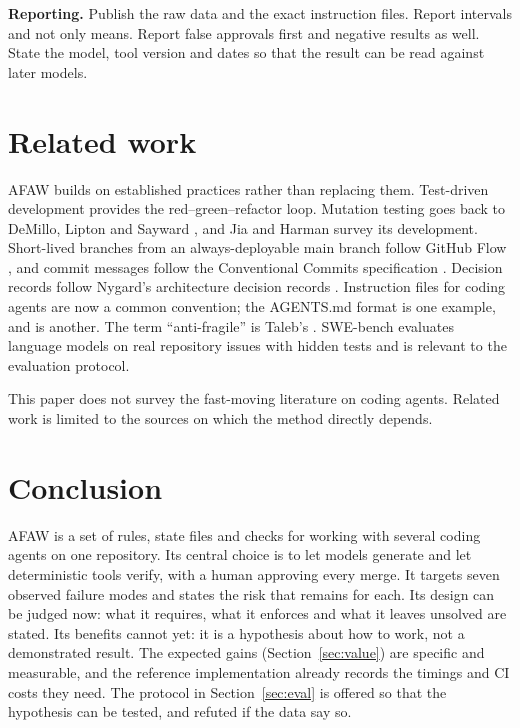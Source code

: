 \documentclass[11pt,a4paper]{article}
\newcommand{\code}[1]{\path{#1}}
\begin{document}
\textbf{Reporting.} Publish the raw data and the exact instruction files. Report intervals and not only means. Report false approvals first and negative results as well. State the model, tool version and dates so that the result can be read against later models.

\section{Related work}

AFAW builds on established practices rather than replacing them. Test-driven development \cite{beck2002} provides the red--green--refactor loop. Mutation testing goes back to DeMillo, Lipton and Sayward \cite{demillo1978}, and Jia and Harman \cite{jia2011} survey its development. Short-lived branches from an always-deployable main branch follow GitHub Flow \cite{chacon2011}, and commit messages follow the Conventional Commits specification \cite{conventionalcommits}. Decision records follow Nygard's architecture decision records \cite{nygard2011}. Instruction files for coding agents are now a common convention; the AGENTS.md format \cite{agentsmd} is one example, and \code{CLAUDE.md} is another. The term ``anti-fragile'' is Taleb's \cite{taleb2012}. SWE-bench \cite{jimenez2024} evaluates language models on real repository issues with hidden tests and is relevant to the evaluation protocol.

This paper does not survey the fast-moving literature on coding agents. Related work is limited to the sources on which the method directly depends.

\section{Conclusion}

AFAW is a set of rules, state files and checks for working with several coding agents on one repository. Its central choice is to let models generate and let deterministic tools verify, with a human approving every merge. It targets seven observed failure modes and states the risk that remains for each. Its design can be judged now: what it requires, what it enforces and what it leaves unsolved are stated. Its benefits cannot yet: it is a hypothesis about how to work, not a demonstrated result. The expected gains (Section~\ref{sec:value}) are specific and measurable, and the reference implementation already records the timings and CI costs they need. The protocol in Section~\ref{sec:eval} is offered so that the hypothesis can be tested, and refuted if the data say so.
\end{document}
